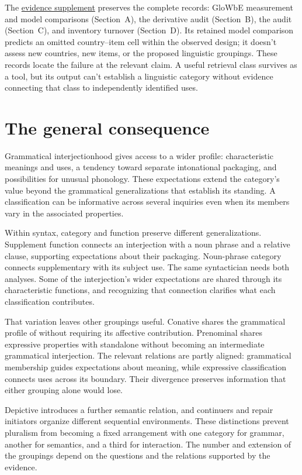 \documentclass[12pt]{article}
\begin{document}
The \href{inquiry-relative-evidence-supplement.pdf}{evidence supplement}
preserves the complete records: GloWbE measurement and model comparisons
(Section~A), the derivative audit (Section~B), the  audit
(Section~C), and inventory turnover (Section~D). Its retained model
comparison predicts an omitted country--item cell within the observed
design; it doesn't assess new countries, new items, or the proposed
linguistic groupings. These records locate
the failure at the relevant claim. A useful retrieval class survives
as a tool, but its output can't establish a linguistic category
without evidence connecting that class to independently identified uses.

\section{The general consequence}\label{sec:discussion}

Grammatical interjectionhood gives access to a wider profile: characteristic
meanings and uses, a tendency toward separate intonational packaging,
and possibilities for unusual phonology. These expectations extend the
category's value beyond the grammatical generalizations that establish
its standing. A classification can be informative across several inquiries
even when its members vary in the associated properties.

Within syntax, category and function preserve different generalizations.
Supplement function connects an interjection with a noun phrase and
a relative clause, supporting expectations about their packaging. Noun-phrase
category connects supplementary  with its subject
use. The same syntactician needs both analyses. Some of the interjection's
wider expectations are shared through its characteristic functions, and
recognizing that connection clarifies what each classification contributes.

That variation leaves other groupings useful. Conative  shares the grammatical profile
of  without requiring its affective contribution. Prenominal
 shares expressive properties with standalone 
without becoming an intermediate grammatical interjection. The relevant
relations are partly aligned: grammatical membership guides expectations
about meaning, while expressive classification connects uses across its
boundary. Their divergence preserves information that either grouping
alone would lose.

Depictive  introduces a further semantic relation, and continuers
and repair initiators organize different sequential environments. These
distinctions prevent pluralism from becoming a fixed arrangement with
one category for grammar, another for semantics, and a third for interaction.
The number and extension of the groupings depend on the questions
and the relations supported by the evidence.
\end{document}
